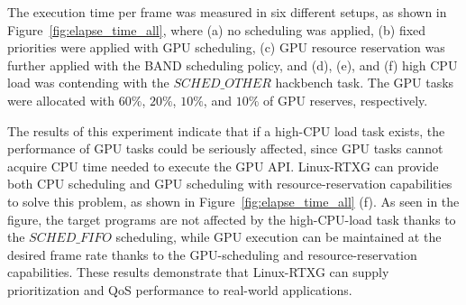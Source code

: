 The execution time per frame was measured in six different setups, as shown in Figure~\ref{fig:elapse_time_all}, where (a) no scheduling was applied, (b) fixed priorities were applied with GPU scheduling, (c) GPU resource reservation was further applied with the BAND scheduling policy, and (d), (e), and (f) high CPU load was contending with the $SCHED\_OTHER$ hackbench task.
The GPU tasks were allocated with $60\%$, $20\%$, $10\%$, and $10\%$ of GPU reserves, respectively.

The results of this experiment indicate that if a high-CPU load task exists, the performance of GPU tasks could be seriously affected, since GPU tasks cannot acquire CPU time needed to execute the GPU API.
Linux-RTXG can provide both CPU scheduling and GPU scheduling with resource-reservation capabilities to solve this problem, as shown in Figure~\ref{fig:elapse_time_all} (f).
As seen in the figure, the target programs are not affected by the high-CPU-load task thanks to the $SCHED\_FIFO$ scheduling, while GPU execution can be maintained at the desired frame rate thanks to the GPU-scheduling and resource-reservation capabilities.
These results demonstrate that Linux-RTXG can supply prioritization and QoS performance to real-world applications.
 

